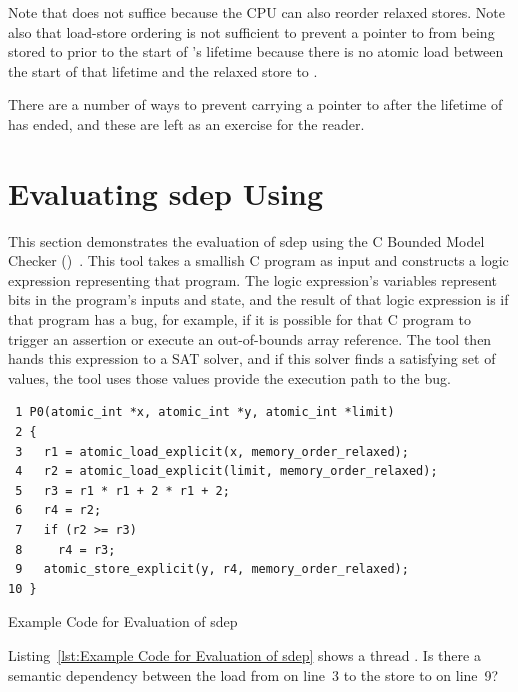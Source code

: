 \documentclass[10]{article}
\begin{document}
Note that  does not suffice because the CPU
can also reorder relaxed stores.
Note also that load-store ordering is not sufficient to prevent a
pointer to  from being stored to  prior to the start of
's lifetime because there is no atomic load between the start
of that lifetime and the relaxed store to .

There are a number of ways to prevent carrying a pointer to  after
the lifetime of  has ended, and these are left as an exercise for
the reader.

\clearpage

\section{Evaluating sdep Using }
\label{sec:Evaluating sdep Using cbmc}

This section demonstrates the evaluation of sdep using
the C Bounded Model Checker
()~\cite{EdmundClarke2004CBMC}.
This tool takes a smallish C program as input and constructs a logic
expression representing that program.
The logic expression's variables represent bits in the program's inputs
and state, and the result of that logic expression is  if that
program has a bug, for example, if it is possible for that C program to
trigger an assertion or execute an out-of-bounds array reference.
The tool then hands this expression to a SAT solver, and if this solver
finds a satisfying set of values, the tool uses those values provide
the execution path to the bug.

\begin{listing}[tbp]
\scriptsize
\begin{verbatim}
 1 P0(atomic_int *x, atomic_int *y, atomic_int *limit)
 2 {
 3   r1 = atomic_load_explicit(x, memory_order_relaxed);
 4   r2 = atomic_load_explicit(limit, memory_order_relaxed);
 5   r3 = r1 * r1 + 2 * r1 + 2;
 6   r4 = r2;
 7   if (r2 >= r3)
 8     r4 = r3;
 9   atomic_store_explicit(y, r4, memory_order_relaxed);
10 }
\end{verbatim}
\caption{Example Code for Evaluation of sdep}
\label{lst:Example Code for Evaluation of sdep}
\end{listing}

Listing~\ref{lst:Example Code for Evaluation of sdep}
shows a  thread .
Is there a semantic dependency between the load from  on
line~3 to the store to  on line~9?
\end{document}
